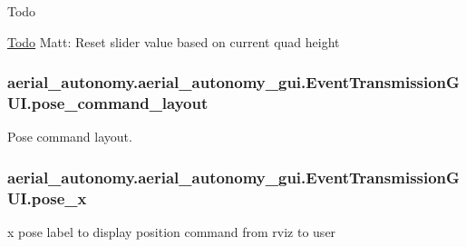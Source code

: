\begin{DoxyRefDesc}{Todo}
\item[\hyperlink{todo__todo000002}{Todo}]Matt\-: Reset slider value based on current quad height \end{DoxyRefDesc}
\hypertarget{classaerial__autonomy_1_1aerial__autonomy__gui_1_1EventTransmissionGUI_a966d066bb1db4ea2517dc68335b3df98}{
\subsubsection[{pose\-\_\-command\-\_\-layout}]{\setlength{\rightskip}{0pt plus 5cm}aerial\-\_\-autonomy.\-aerial\-\_\-autonomy\-\_\-gui.\-Event\-Transmission\-G\-U\-I.\-pose\-\_\-command\-\_\-layout}}\label{classaerial__autonomy_1_1aerial__autonomy__gui_1_1EventTransmissionGUI_a966d066bb1db4ea2517dc68335b3df98}


Pose command layout. 

\hypertarget{classaerial__autonomy_1_1aerial__autonomy__gui_1_1EventTransmissionGUI_a750b19ad6b27411d6ff502aa4ba43ed8}{
\subsubsection[{pose\-\_\-x}]{\setlength{\rightskip}{0pt plus 5cm}aerial\-\_\-autonomy.\-aerial\-\_\-autonomy\-\_\-gui.\-Event\-Transmission\-G\-U\-I.\-pose\-\_\-x}}\label{classaerial__autonomy_1_1aerial__autonomy__gui_1_1EventTransmissionGUI_a750b19ad6b27411d6ff502aa4ba43ed8}


x pose label to display position command from rviz to user 

